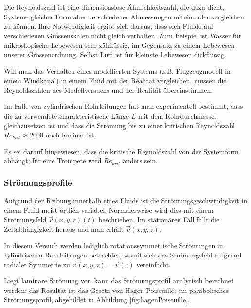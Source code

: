 Die Reynoldszahl  ist eine dimensionslose \"Ahnlichkeitszahl,  die dazu dient,
Systeme gleicher  Form aber verschiedener Abmessungen  miteinander vergleichen
zu  k\"onnen. Ihre Notwendigkeit  ergibt  sich daraus,  dass  sich Fluide  auf
verschiedenen Gr\"ossenskalen nicht gleich  verhalten. Zum Beispiel ist Wasser
f\"ur  mikroskopische Lebewesen  sehr  z\"ahfl\"ussig, im  Gegensatz zu  einem
Lebewesen unserer  Gr\"ossenordnung. Selbst Luft ist f\"ur  kleinste Lebewesen
dickfl\"ussig.

Will  man das  Verhalten  eines modellierten  Systems (z.B. Flugzeugmodell  in
einem Windkanal) in  einem Fluid mit der Realit\"at  vergleichen, m\"ussen die
Reynoldszahlen des Modellversuchs und der Realit\"at \"ubereinstimmen.

Im Falle von zylindrischen Rohrleitungen  hat man experimentell bestimmt, dass
die  zu  verwendete  charakteristische  L\"ange $L$  mit  dem  Rohrdurchmesser
gleichzusetzen  ist   und  dass  die   Str\"omung  bis  zu   einer  kritischen
Reynoldszahl $\mathit{Re}_{krit} \approx 2000$ noch laminar ist.

Es sei darauf hingewiesen, dass  die kritische Reynoldszahl von der Systemform
abh\"angt; f\"ur eine Trompete wird $\mathit{Re}_{krit}$ anders sein.


\subsubsection{Str\"omungsprofile}
\label{subsubsec:stromungsprofile}

Aufgrund der Reibung innerhalb eines Fluids ist die Str\"omungsgeschwindigkeit
in einem  Fluid meist  \"ortlich variabel. Normalerweise  wird dies  mit einem
Str\"omungsfeld $\vec{v}(x,y,z)(t)$ beschrieben. Im station\"aren Fall f\"allt
die Zeitabh\"angigkeit heraus und man erh\"alt $\vec{v}(x,y,z)$.

In  diesem  Versuch  werden lediglich  rotationssymmetrische  Str\"omungen  in
zylindrischen  Rohrleitungen   betrachtet,  womit  sich   das  Str\"omungsfeld
aufgrund radialer Symmetrie zu $\vec{v}(x,y,z) = \vec{v}(r)$ vereinfacht.

Liegt laminare Str\"omung vor, kann das Str\"omungsprofil analytisch berechnet
werden; das  Resultat ist das  Gesetz von Hagen-Poiseuille;  ein parabolisches
Str\"omungsprofil, abgebildet in Abbildung \ref{fig:hagenPoiseuille}.

